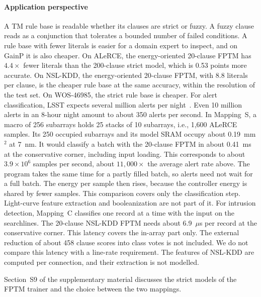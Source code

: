 \documentclass[preprint,review,12pt]{elsarticle}
\newcommand{\gainp}{GainP}
\newcommand{\hyp}[1]{#1}   %
\newcommand{\wosnew}[1]{#1}   %
\begin{document}
\paragraph{Application perspective}
A TM rule base is readable whether its clauses are strict or fuzzy.
A fuzzy clause reads as a conjunction that tolerates a bounded number of failed conditions.
\wosnew{A rule base with fewer literals is easier for a domain expert to inspect, and on \gainp{} it is also cheaper.
On ALeRCE, the energy-oriented 20-clause FPTM has $4.4\times$ fewer literals than the 200-clause strict model, which is 0.53 points more accurate. On NSL-KDD, the energy-oriented 20-clause FPTM, with 8.8 literals per clause, is the cheaper rule base at the same accuracy, within the resolution of the test set. On WOS-46985, the strict rule base is cheaper.}
For alert classification, LSST expects several million alerts per night~\cite{ivezic2019lsst}. \hyp{Even 10 million alerts in an 8-hour night amount to about 350 alerts per second.
In Mapping~S, a macro of 256 subarrays holds 25 stacks of 10 subarrays, i.e., 1,600 ALeRCE samples. Its 250 occupied subarrays and its model SRAM occupy about 0.19~mm$^2$ at 7~nm. It would classify a batch with the 20-clause FPTM in about 0.41~ms at the conservative corner, including input loading. This corresponds to about $3.9\times10^6$ samples per second, about $11{,}000\times$ the average alert rate above.
The program takes the same time for a partly filled batch, so alerts need not wait for a full batch. The energy per sample then rises, because the controller energy is shared by fewer samples.}
This comparison covers only the classification step. Light-curve feature extraction and booleanization are not part of it.
For intrusion detection, Mapping~C classifies one record at a time with the input on the searchlines. \hyp{The 20-clause NSL-KDD FPTM needs about 6.9~$\mu$s per record at the conservative corner.} This latency covers the in-array part only. The external reduction of about 458 clause scores into class votes is not included. We do not compare this latency with a line-rate requirement. The features of NSL-KDD are computed per connection, and their extraction is not modelled.

\wosnew{Section~S9 of the supplementary material discusses the strict models of the FPTM trainer and the choice between the two mappings.}
\end{document}
